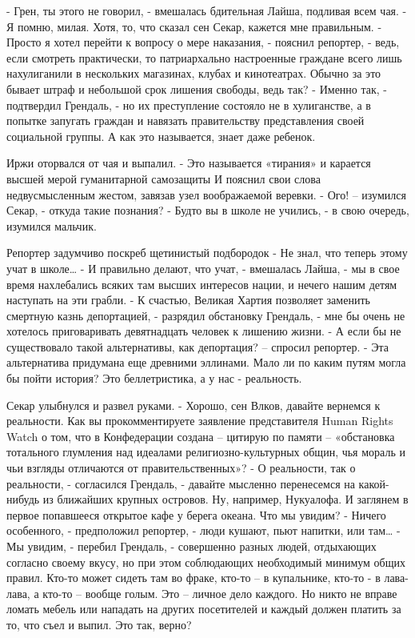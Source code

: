 - Грен, ты этого не говорил, - вмешалась бдительная Лайша, подливая всем чая.
- Я помню, милая. Хотя, то, что сказал сен Секар, кажется мне правильным.
- Просто я хотел перейти к вопросу о мере наказания, - пояснил репортер, - ведь, если смотреть практически, то патриархально настроенные граждане всего лишь нахулиганили в нескольких магазинах, клубах и кинотеатрах. Обычно за это бывает штраф и небольшой срок лишения свободы, ведь так?
- Именно так, - подтвердил Грендаль, - но их преступление состояло не в хулиганстве, а в попытке запугать граждан и навязать правительству представления своей социальной группы. А как это называется, знает даже ребенок.

Иржи оторвался от чая и выпалил.
- Это называется «тирания» и карается высшей мерой гуманитарной самозащиты
И пояснил свои слова недвусмысленным жестом, завязав узел воображаемой веревки.
- Ого! – изумился Секар, - откуда такие познания?
- Будто вы в школе не учились, - в свою очередь, изумился мальчик.

Репортер задумчиво поскреб щетинистый подбородок
- Не знал, что теперь этому учат в школе…
- И правильно делают, что учат, - вмешалась Лайша, - мы в свое время нахлебались всяких там высших интересов нации, и нечего нашим детям наступать на эти грабли.
- К счастью, Великая Хартия позволяет заменить смертную казнь депортацией, - разрядил обстановку Грендаль, - мне бы очень не хотелось приговаривать девятнадцать человек к лишению жизни.
- А если бы не существовало такой альтернативы, как депортация? – спросил репортер.
- Эта альтернатива придумана еще древними эллинами. Мало ли по каким путям могла бы пойти история? Это беллетристика, а у нас - реальность.

Секар улыбнулся и развел руками.
- Хорошо, сен Влков, давайте вернемся к реальности. Как вы прокомментируете заявление представителя Human Rights Watch о том, что в Конфедерации создана – цитирую по памяти – «обстановка тотального глумления над идеалами религиозно-культурных общин, чья мораль и чьи взгляды отличаются от правительственных»?
- О реальности, так о реальности, - согласился Грендаль, - давайте мысленно перенесемся на какой-нибудь из ближайших крупных островов. Ну, например, Нукуалофа. И заглянем в первое попавшееся открытое кафе у берега океана. Что мы увидим?
- Ничего особенного, - предположил репортер, - люди кушают, пьют напитки, или там…
- Мы увидим, - перебил Грендаль, - совершенно разных людей, отдыхающих согласно своему вкусу, но при этом соблюдающих необходимый минимум общих правил. Кто-то может сидеть там во фраке, кто-то – в купальнике, кто-то - в лава-лава, а кто-то – вообще голым. Это – личное дело каждого. Но никто не вправе ломать мебель или нападать на других посетителей и каждый должен платить за то, что съел и выпил. Это так, верно?

